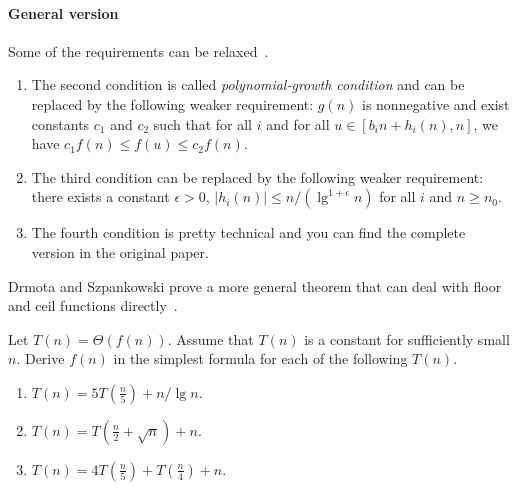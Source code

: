 \paragraph{General version}
Some of the requirements can be relaxed~\cite{Leighton1996}.
\begin{enumerate}
\item The second condition is called {\em polynomial-growth condition} and can be replaced by the following weaker requirement: $g(n)$ is nonnegative and exist constants $c_1$ and $c_2$ such that for all $i$ and for all $u \in [b_in + h_i(n), n]$, we have $c_1f(n) \leq f(u) \leq c_2 f(n)$.
\item The third condition can be replaced by the following weaker requirement: there exists a constant $\epsilon > 0$, $|h_i(n)| \leq n / (\lg^{1 + \epsilon} n)$ for all $i$ and $n \geq n_0$.
\item The fourth condition is pretty technical and you can find the complete version in the original paper.
\end{enumerate}
Drmota and Szpankowski prove a more general theorem that can deal with floor and ceil functions directly~\cite{Drmota2013}.
\begin{Exercise}
Let $T(n) = \Theta(f(n))$. Assume that $T(n)$ is a constant for sufficiently small $n$. Derive $f(n)$ in the simplest formula for each of the following $T(n)$.
\begin{enumerate}
\item $T(n) = 5T(\frac{n}{5}) + n/\lg n$. \label{ABmethod:1} 
\item $T(n) = T(\frac{n}{2} + \sqrt{n}) + n$. \label{ABmethod:2} 
\item $T(n) = 4T(\frac{n}{5}) + T(\frac{n}{4}) + n$. \label{ABmethod:3} 
\end{enumerate}
\end{Exercise}

